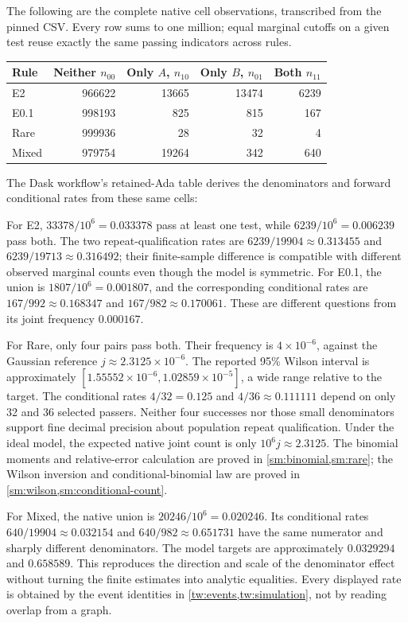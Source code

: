The following are the complete native cell observations, transcribed from
the pinned CSV. Every row sums to one million; equal marginal cutoffs on a
given test reuse exactly the same passing indicators across rules.
\begin{center}\small
\begin{tabular}{lrrrr}
\toprule
Rule & Neither \(n_{00}\) & Only \(A\), \(n_{10}\) & Only \(B\), \(n_{01}\) & Both \(n_{11}\)\\
\midrule
E2    & 966622 & 13665 & 13474 & 6239\\
E0.1  & 998193 & 825   & 815   & 167\\
Rare  & 999936 & 28    & 32    & 4\\
Mixed & 979754 & 19264 & 342   & 640\\
\bottomrule
\end{tabular}
\end{center}
The Dask workflow's retained-Ada table derives the denominators and
forward conditional rates from these same cells:


For E2, \(33378/10^6=0.033378\) pass at least one test, while
\(6239/10^6=0.006239\) pass both. The two repeat-qualification rates are
\(6239/19904\approx0.313455\) and
\(6239/19713\approx0.316492\); their finite-sample difference is compatible
with different observed marginal counts even though the model is symmetric.
For E0.1, the union is \(1807/10^6=0.001807\), and the corresponding
conditional rates are \(167/992\approx0.168347\) and
\(167/982\approx0.170061\). These are different questions from its joint
frequency \(0.000167\).

For Rare, only four pairs pass both. Their frequency is
\(4\times10^{-6}\), against the Gaussian reference
\(j\approx2.3125\times10^{-6}\). The reported 95\% Wilson interval is
approximately \([1.55552\times10^{-6},1.02859\times10^{-5}]\), a wide
range relative to the target. The conditional rates \(4/32=0.125\) and
\(4/36\approx0.111111\) depend on only 32 and 36 selected passers.
Neither four successes nor those small denominators support fine decimal
precision about population repeat qualification. Under the ideal model,
the expected native joint count is only \(10^6j\approx2.3125\).
The binomial moments and relative-error calculation are proved in
\cref{sm:binomial,sm:rare}; the Wilson inversion and conditional-binomial
law are proved in \cref{sm:wilson,sm:conditional-count}.

For Mixed, the native union is \(20246/10^6=0.020246\).
Its conditional rates \(640/19904\approx0.032154\) and
\(640/982\approx0.651731\) have the same numerator and sharply different
denominators. The model targets are approximately \(0.0329294\) and
\(0.658589\). This reproduces the direction and scale of the denominator
effect without turning the finite estimates into analytic equalities.
Every displayed rate is obtained by the event identities in
\cref{tw:events,tw:simulation}, not by reading overlap from a graph.

